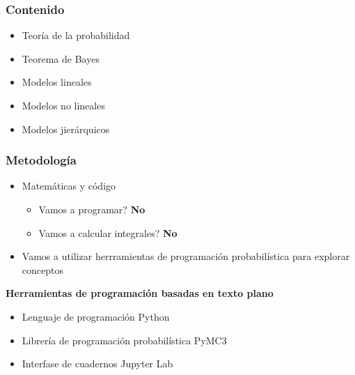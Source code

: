 \documentclass[xcolor=dvipsnames,10pt]{beamer}
\begin{document}
%
\begin{frame}
  \frametitle{Contenido}
  \begin{tcolorbox}[title=Fundamentos]
    \begin{itemize}
    \item Teoría de la probabilidad
    \item Teorema de Bayes
    \end{itemize}
  \end{tcolorbox}
  \begin{tcolorbox}[title=Regresión]
    \begin{itemize}
    \item Modelos lineales
    \item Modelos no lineales
    \item Modelos jierárquicos
    \end{itemize}
  \end{tcolorbox}
\end{frame}
%
\begin{frame}
  \frametitle{Metodología}
  \begin{itemize}
  \item Matemáticas y código
    \begin{itemize}
    \item Vamos a programar? \textbf{No}
    \item Vamos a calcular integrales? \textbf{No}
    \end{itemize}
  \item Vamos a utilizar herrramientas de programación probabilística para explorar conceptos
  \end{itemize}
  \textbf{Herramientas de programación basadas en texto plano}
  \begin{itemize}
  \item Lenguaje de programación \textsf{Python}
  \item Librería de programación probabilística \textsf{PyMC3}
  \item Interfase de cuadernos \textsf{Jupyter Lab}
  \end{itemize}
\end{frame}
%
\end{document}
